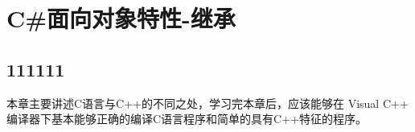 ﻿%

\chapter{C\#面向对象特性-继承}
\section{111111}
本章主要讲述C语言与C++的不同之处，学习完本章后，应该能够在 Visual C++
编译器下基本能够正确的编译C语言程序和简单的具有C++特征的程序。

 

